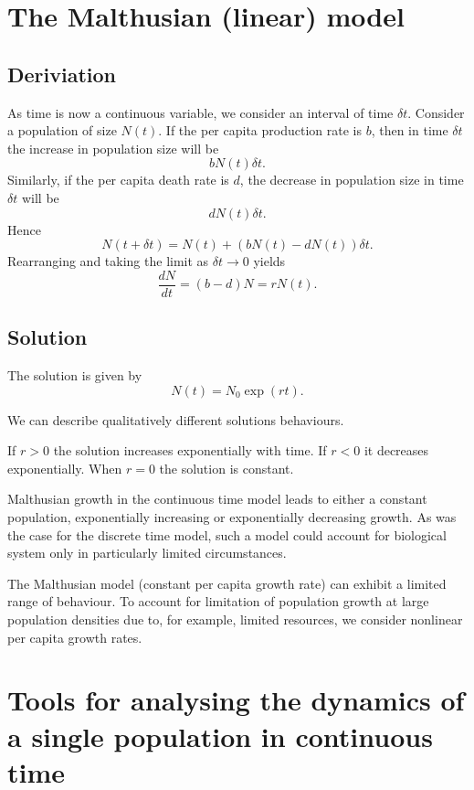 \documentclass[
  letterpaper,
  DIV=11,
  numbers=noendperiod]{scrreprt}
\begin{document}
\section{The Malthusian (linear)
model}\label{the-malthusian-linear-model}

\subsection{Deriviation}\label{deriviation}

As time is now a continuous variable, we consider an interval of time
\(\delta t\). Consider a population of size \(N(t)\). If the per capita
production rate is \(b\), then in time \(\delta t\) the increase in
population size will be \[
b N(t) \delta t.
\] Similarly, if the per capita death rate is \(d\), the decrease in
population size in time \(\delta t\) will be \[
d N(t) \delta t.
\] Hence \[
N(t+\delta t)= N(t) + (bN(t)-dN(t))\delta t.
\] Rearranging and taking the limit as \(\delta t \rightarrow 0\) yields
\[
\frac{dN}{dt}=(b-d)N=rN(t).
\]

\subsection{Solution}\label{solution}

The solution is given by \[
N(t)=N_0\exp(rt).
\]

We can describe qualitatively different solutions behaviours.

If \(r>0\) the solution increases exponentially with time. If \(r<0\) it
decreases exponentially. When \(r=0\) the solution is constant.

Malthusian growth in the continuous time model leads to either a
constant population, exponentially increasing or exponentially
decreasing growth. As was the case for the discrete time model, such a
model could account for biological system only in particularly limited
circumstances.

The Malthusian model (constant per capita growth rate) can exhibit a
limited range of behaviour. To account for limitation of population
growth at large population densities due to, for example, limited
resources, we consider nonlinear per capita growth rates.

\section{Tools for analysing the dynamics of a single population in
continuous
time}\label{tools-for-analysing-the-dynamics-of-a-single-population-in-continuous-time}
\end{document}
